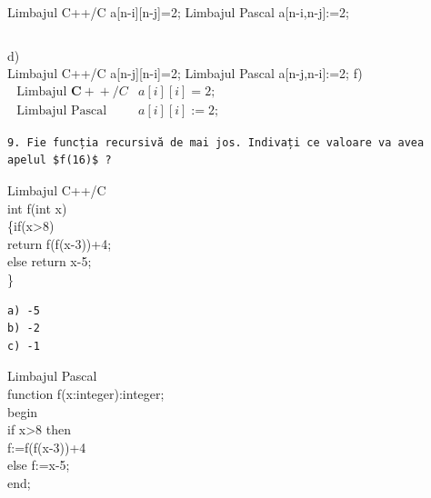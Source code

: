 \documentclass[10pt]{article}
\begin{document}
\begin{verbatim}

\end{verbatim}

Limbajul C++/C a[n-i][n-j]=2; Limbajul Pascal a[n-i,n-j]:=2;

\begin{verbatim}

\end{verbatim}

d)\\[0pt]
Limbajul C++/C a[n-j][n-i]=2; Limbajul Pascal a[n-j,n-i]:=2; f)\\
$\begin{array}{ll}\text { Limbajul } \mathbf{C +}+/ C & a[i][i]=2 ; \\ \text { Limbajul Pascal } & a[i][i]:=2 ;\end{array}$

\begin{verbatim}
9. Fie funcția recursivă de mai jos. Indivați ce valoare va avea apelul $f(16)$ ?
\end{verbatim}

Limbajul C++/C\\
int f(int x)\\
\{if(x>8)\\
return f(f(x-3))+4;\\
else return x-5;\\
\}

\begin{verbatim}
a) -5
b) -2
c) -1
\end{verbatim}

Limbajul Pascal\\
function f(x:integer):integer;\\
begin\\
if x>8 then\\
f:=f(f(x-3))+4\\
else f:=x-5;\\
end;
\end{document}
